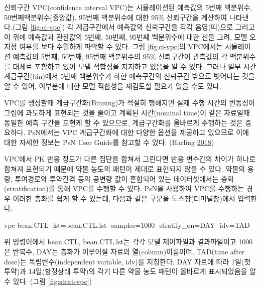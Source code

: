 \documentclass[
  10pt,
  krantz2,
  a4paper]{krantz}
\newenvironment{Shaded}{\begin{snugshade}}{\end{snugshade}}
\newcommand{\ExtensionTok}[1]{#1}
\newcommand{\NormalTok}[1]{#1}
\newenvironment{Shaded}{\begin{snugshade}}{\end{snugshade}}
\theoremstyle{definition}
\theoremstyle{definition}
\theoremstyle{definition}
\theoremstyle{remark}
\begin{document}
신뢰구간 VPC(confidence interval VPC)는 시뮬레이션된 예측값의 5번째 백분위수, 50번째백분위수(중앙값), 95번째 백분위수에 대한 95\% 신뢰구간을 계산하여 나타낸다.(그림 \ref{fig:ci-vpc}) 각 계급구간에서 예측값의 신뢰구간을 각각 음영(띠)으로 그리고 이 위에 예측값과 관찰값의 5번째, 50번째, 95번째 백분위수에 대한 선을 그려, 모델 오지정 여부를 보다 수월하게 파악할 수 있다. 그림 \ref{fig:ci-vpc}의 VPC에서는 시뮬레이션 예측값의 5번째, 50번째, 95번째 백분위수의 95\% 신뢰구간이 관측값의 각 백분위수를 대체로 포함하고 있어 모델 적합성을 지지하고 있음을 알 수 있다. 그러나 일부 시간 계급구간(bin)에서 5번째 백분위수가 하한 예측구간의 신뢰구간 밖으로 벗어나는 것을 알 수 있어, 이부분에 대한 모델 적합성을 재검토할 필요가 있을 수도 있다.


VPC를 생성할때 계급구간화(Binning)가 적절히 행해지면 실제 수행 시간의 변동성이 그림에 과도하게 표현되는 것을 줄이고 계획된 시간(nominal time)이 같은 자료일때 동일한 예측 구간을 표현케 할 수 있으므로, 계급구간화를 올바르게 수행하는 것은 중요하다. PsN에서는 VPC 계급구간화에 대한 다양한 옵션을 제공하고 있으므로 이에 대한 자세한 정보는 PsN User Guide를 참고할 수 있다. (Harling \protect\hyperlink{ref-vpcnpc}{2018})


VPC에서 PK 반응 정도가 다른 집단을 합쳐서 그린다면 반응 변수간의 차이가 하나로 합쳐져 표현되기 때문에 약물 농도의 패턴이 제대로 표현되지 않을 수 있다. 약물의 용량, 투여경로와 투약간격 등의 공변량 값이 혼합되어 있는 데이터셋에서는 층화(stratification)를 통해 VPC를 수행할 수 있다. PsN을 사용하여 VPC를 수행하는 경우 이러한 층화를 쉽게 할 수 있는데, 다음과 같은 구문을 도스창(터미널창)에서 입력한다.

\begin{Shaded}
\begin{Highlighting}[]
\ExtensionTok{vpc}\NormalTok{ bean.CTL {-}lst=bean.CTL.lst {-}samples=1000 {-}stratify\_on=DAY {-}idv=TAD}
\end{Highlighting}
\end{Shaded}

위 명령어에서 bean.CTL, bean.CTL.lst는 각각 모델 제어파일과 결과파일이고 1000은 반복수, DAY는 층화가 이루어질 자료의 열(column)이름이며, TAD(time after dose)는 독립변수(independent variable, idv)를 지칭한다. DAY 자료에 따라 1일(첫 투약)과 14일(항정상태 투약)의 각기 다른 약물 농도 패턴이 올바르게 표시되었음을 알 수 있다. (그림 \ref{fig:strat-vpc})
\end{document}
